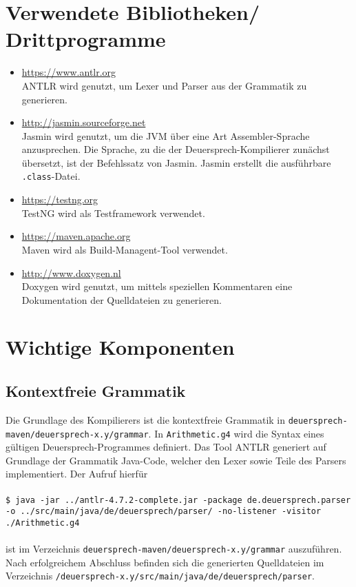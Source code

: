\documentclass[a4paper]{article}
\begin{document}
    \section{Verwendete Bibliotheken/ Drittprogramme}
    \begin{itemize}
        \item \href{https://www.antlr.org/}{https://www.antlr.org} \\
            ANTLR wird genutzt, um Lexer und Parser aus der Grammatik zu generieren. 
        \item \href{http://jasmin.sourceforge.net/}{http://jasmin.sourceforge.net} \\
            Jasmin wird genutzt, um die JVM über eine Art Assembler-Sprache anzusprechen. Die Sprache, zu die der Deuersprech-Kompilierer zunächst übersetzt, ist der Befehlssatz von Jasmin. 
            Jasmin erstellt die ausführbare \texttt{.class}-Datei.
        \item \href{https://testng.org/doc/}{https://testng.org} \\
            TestNG wird als Testframework verwendet.
        \item \href{https://maven.apache.org/}{https://maven.apache.org} \\
            Maven wird als Build-Managent-Tool verwendet.
        \item \href{http://www.doxygen.nl/}{http://www.doxygen.nl} \\
            Doxygen wird genutzt, um mittels speziellen Kommentaren eine Dokumentation der Quelldateien zu generieren.
    \end{itemize}

    \section{Wichtige Komponenten}
    \subsection{Kontextfreie Grammatik}
    Die Grundlage des Kompilierers ist die kontextfreie Grammatik in 
    \texttt{deuersprech-maven/deuersprech-x.y/grammar}. In \texttt{Arithmetic.g4} wird die Syntax eines gültigen Deuersprech-Programmes definiert.
    Das Tool ANTLR generiert auf Grundlage der Grammatik Java-Code, welcher den Lexer sowie Teile des Parsers implementiert. Der Aufruf hierfür \\
    \\
    \texttt{\$ java -jar ../antlr-4.7.2-complete.jar -package de.deuersprech.parser \\ -o ../src/main/java/de/deuersprech/parser/ -no-listener -visitor ./Arithmetic.g4} \\
    \\
    ist im Verzeichnis \texttt{deuersprech-maven/deuersprech-x.y/grammar} auszuführen. Nach erfolgreichem Abschluss befinden sich die generierten Quelldateien im Verzeichnis \texttt{/deuersprech-x.y/src/main/java/de/deuersprech/parser}.
\end{document}
